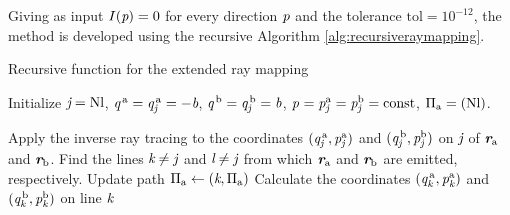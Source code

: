 \begin{enumerate}
\begin{itemize}
\end{itemize}

\end{enumerate}
Giving as input $I(\textit{p})=0$ for every direction $\textit{p}$ and the tolerance $\textrm{tol}=10^{-12}$,
the method is developed using the recursive Algorithm \ref{alg:recursiveraymapping}.
\begin{algorithm}
\caption{Recursive function for the extended ray mapping}\label{alg:recursiveraymapping}
Initialize $\textit{j} = \textrm{Nl}$, $\textit{q}^{\,\textrm{a}}= \textit{q}^{\,\textrm{a}}_{\textit{j}}=-\textit{b}$, $\textit{q}^{\,\textrm{b}}= \textit{q}^{\,\textrm{b}}_{\textit{j}}=\textit{b}$, $\textit{p}_{\textrm{} \textit{}}=\textit{p}^{\textrm{a}}_{\textit{j}}=\textit{p}^{\textrm{b}}_{\textit{j}}=\textrm{const}$, $\Pi_{\textrm{a}}=({\textrm{Nl}})$.
\begin{algorithmic}[1]
\State Apply the inverse ray tracing to the coordinates $(\textit{q}^{\,\textrm{a}}_{\textit{j}},\textit{p}^{\textrm{a}}_{\textit{j}})$ and $(\textit{q}^{\,\textrm{b}}_{\textit{j}},\textit{p}^{\textrm{b}}_{\textit{j}})$ on $\textit{j}$ of $\textit{\textbf{r}}_{\textrm{a}}$ and $\textit{\textbf{r}}_{\textrm{b}}$.
\State Find the lines $\textit{k}\neq\textit{j}$ and $\textit{l}\neq\textit{j}$ from which $\textit{\textbf{r}}_{\textrm{a}}$ and $\textit{\textbf{r}}_{\textrm{b}}$ are emitted, respectively.
\State Update path $\Pi_{\textrm{a}}\gets(\textit{k}, \Pi_{\textrm{a}})$
\State Calculate the coordinates $(\textit{q}^{\,\textrm{a}}_{\textit{k}},\textit{p}^{\textrm{a}}_{\textit{k}})$ and $(\textit{q}^{\,\textrm{b}}_{\textit{k}}, \textit{p}^{\textrm{b}}_{\textit{k}})$ on line $\textit{k}$
\If {$\lineaj = \lineak$}
\State{}
\end{algorithmic}
\end{algorithm}
